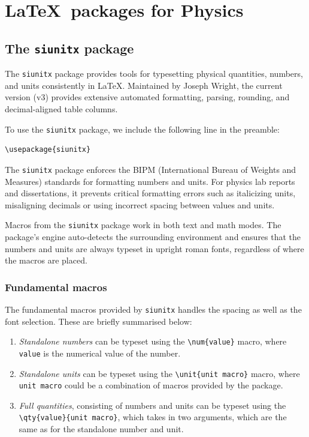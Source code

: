 \section{\LaTeX\ packages for Physics}
	
	
	\subsection{The \texttt{siunitx} package}
		The \lstinline|siunitx| package provides tools for typesetting physical quantities, numbers, and units consistently in \LaTeX. Maintained by Joseph Wright, the current version (v3) provides extensive automated formatting, parsing, rounding, and decimal-aligned table columns.
		
		To use the \lstinline|siunitx| package, we include the following line in the preamble:
\begin{lstlisting}
\usepackage{siunitx}
\end{lstlisting}
		
		The \lstinline|siunitx| package enforces the BIPM (International Bureau of Weights and Measures) standards for formatting numbers and units. For physics lab reports and dissertations, it prevents critical formatting errors such as italicizing units, misaligning decimals or using incorrect spacing between values and units.
		
		Macros from the \lstinline|siunitx| package work in both text and math modes. The package's engine auto-detects the surrounding environment and ensures that the numbers and units are always typeset in upright roman fonts, regardless of where the macros are placed.
		
		\subsubsection{Fundamental macros}
			The fundamental macros provided by \lstinline|siunitx| handles the spacing as well as the font selection. These are briefly summarised below:
			\begin{enumerate}
				\item \emph{Standalone numbers} can be typeset using the \lstinline|\num{value}| macro, where \verb|value| is the numerical value of the number.
				
				\item \emph{Standalone units} can be typeset using the \lstinline|\unit{unit macro}| macro, where \verb|unit macro| could be a combination of macros provided by the package.
				
				\item \emph{Full quantities}, consisting of numbers and units can be typeset using the\\ \lstinline|\qty{value}{unit macro}|, which takes in two arguments, which are the same as for the standalone number and unit.
			\end{enumerate}
			
